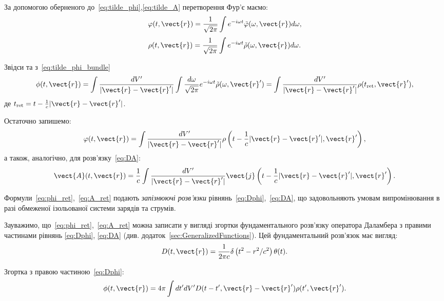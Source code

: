 За допомогою оберненого до~\eqref{eq:tilde_phi},\eqref{eq:tilde_A} перетворення Фур'є маємо:
\begin{equation}
	\varphi (t, \vect{r}) = \frac{1}{\sqrt{2\pi}} \int e^{-i\omega t} \tilde{\varphi} (\omega, \vect{r}) d\omega,
\end{equation}
\begin{equation}
	\rho (t, \vect{r}) = \frac{1}{\sqrt{2\pi}} \int e^{-i\omega t} \tilde{\rho} (\omega, \vect{r}) d\omega.
\end{equation}

Звідси та з~\eqref{eq:tilde_phi_bundle}
\begin{equation}
	\phi (t, \vect{r}) = \int \frac{dV'}{|\vect{r} - \vect{r}'|} \int \frac{d\omega}{\sqrt{2\pi}} e^{-i\omega t} \tilde{\rho} (\omega, \vect{r}')
	= \int \frac{dV'}{|\vect{r} - \vect{r}'|} \rho (t_{\text{ret}}, \vect{r}'),
\end{equation}
де $t_{\text{ret}} = t - \frac{1}{c} |\vect{r} - \vect{r}'|$.

Остаточно запишемо:
\begin{equation}\label{eq:phi_ret}
	\varphi (t, \vect{r}) = \int \frac{dV'}{|\vect{r} - \vect{r}'|} \rho \left( t - \frac{1}{c} |\vect{r} - \vect{r}'|, \vect{r}' \right),
\end{equation}
а також, аналогічно, для розв’язку~\eqref{eq:DA}:
\begin{equation}\label{eq:A_ret}
	\vect{A} (t, \vect{r}) = \frac{1}{c} \int \frac{dV'}{|\vect{r} - \vect{r}'|} \vect{j} \left( t - \frac{1}{c} |\vect{r} - \vect{r}'|,
	\vect{r}' \right).
\end{equation}

Формули~\eqref{eq:phi_ret},~\eqref{eq:A_ret} подають \textit{запізнюючі розв’язки} рівнянь~\eqref{eq:Dphi},~\eqref{eq:DA}, що задовольняють умовам
випромінювання в разі
обмеженої
ізольованої системи зарядів та струмів.

Зауважимо, що~\eqref{eq:phi_ret},~\eqref{eq:A_ret} можна записати у вигляді згортки фундаментального розв’язку оператора Даламбера з правими частинами
рівнянь
\eqref{eq:Dphi},
\eqref{eq:DA} (див. додаток~\ref{sec:GeneralizedFunctions}). Цей фундаментальний розв’язок має вигляд:
\begin{equation}\label{eq:D}
	D(t, \vect{r}) = \frac{1}{2\pi c} \delta \left( t^2 - r^2 / c^2 \right) \theta(t).
\end{equation}

Згортка з правою частиною~\eqref{eq:Dphi}:
\begin{equation}\label{eq:2.2.18}
	\phi (t, \vect{r}) = 4\pi \int dt' dV' D(t - t', \vect{r} - \vect{r}') \rho (t', \vect{r}').
\end{equation}

